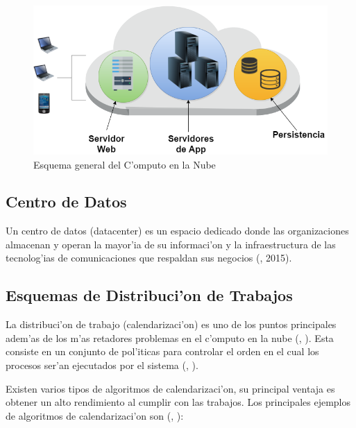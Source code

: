 \begin{figure}
	\caption{Esquema general del C'omputo en la Nube}
	\centering
	\includegraphics[scale=0.5]{media/cloud1}
\end{figure}
\subsection*{Centro de Datos}
Un centro de datos (datacenter) es un espacio dedicado donde las organizaciones almacenan y operan la mayor'ia de su informaci'on y la infraestructura de las tecnolog'ias de comunicaciones que respaldan sus negocios (\citeauthor{whatisdatacenter}, 2015).

\subsection*{Esquemas de Distribuci'on de Trabajos}

La distribuci'on de trabajo (calendarizaci'on) es uno de los puntos principales adem'as de los m'as retadores problemas en el c'omputo en la nube (\citeauthor{li2014greedy}, \citeyear{li2014greedy}). Esta consiste en un conjunto de pol'iticas para controlar el orden en el cual los procesos ser'an ejecutados por el sistema (\citeauthor{agarwal2014efficient}, \citeyear{agarwal2014efficient}).

Existen varios tipos de algoritmos de calendarizaci'on, su principal ventaja es obtener un alto rendimiento al cumplir con las trabajos. Los principales ejemplos de algoritmos de calendarizaci'on son (\citeauthor{salot2013survey}, \citeyear{salot2013survey}):

